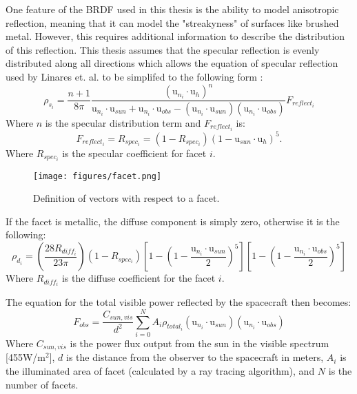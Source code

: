 One feature of the BRDF used in this thesis is the ability to model anisotropic reflection, meaning that it can model the "streakyness" of surfaces like brushed metal. However, this requires additional information to describe the distribution of this reflection. This thesis assumes that the specular reflection is evenly distributed along all directions which allows the equation of specular reflection used by Linares et. al. to be simplifed to the following form \cite{Linares_data_fusion}:
\begin{equation}\label{Phong_Specular}
\rho_{s_i} = \frac{n + 1}{8\pi}
\frac{(\bm{\mathrm{u}}_{n_i}\cdotp \bm{\mathrm{u}}_h)^n}
{\bm{\mathrm{u}}_{n_i}\cdotp \bm{\mathrm{u}}_{sun} + \bm{\mathrm{u}}_{n_i}\cdotp \bm{\mathrm{u}}_{obs} - (\bm{\mathrm{u}}_{n_i}\cdotp \bm{\mathrm{u}}_{sun})(\bm{\mathrm{u}}_{n_i}\cdotp \bm{\mathrm{u}}_{obs})}F_{reflect_i}
\end{equation}
Where $n$ is the specular distribution term and $F_{reflect_i}$ is:
\begin{equation}
F_{reflect_i} = R_{spec_i} = (1 - R_{spec_i})(1 - \bm{\mathrm{u}}_{sun}\cdotp \bm{\mathrm{u}}_h)^5.
\end{equation}
Where $R_{spec_i}$ is the specular coefficient for facet $i$.

\begin{figure}[h!]
	\centering
	\texttt{[image: figures/facet.png]}
	\caption{Definition of vectors with respect to a facet.}
	\label{facet}
\end{figure}

If the facet is metallic, the diffuse component is simply zero, otherwise it is the following:
\begin{equation}\label{Phong_Diffuse}
\rho_{d_i} = \left(\frac{28R_{diff_i}}{23\pi}\right)
(1 - R_{spec_i})
\left[1 - (1 - \frac{\bm{\mathrm{u}}_{n_i}\cdotp \bm{\mathrm{u}}_{sun}}{2})^5\right]
\left[1 - (1 - \frac{\bm{\mathrm{u}}_{n_i}\cdotp \bm{\mathrm{u}}_{obs}}{2})^5\right]
\end{equation}
Where $R_{diff_i}$ is the diffuse coefficient for the facet $i$.

The equation for the total visible power reflected by the spacecraft then becomes:
\begin{equation}
F_{obs} = \frac{C_{sun,vis}}{{d^2}}\sum_{i=0}^N A_i\rho_{total_i}(\bm{\mathrm{u}}_{n_i}\cdotp \bm{\mathrm{u}}_{sun})(\bm{\mathrm{u}}_{n_i}\cdotp \bm{\mathrm{u}}_{obs})
\end{equation}
Where $C_{sun,vis}$ is the power flux output from the sun in the visible spectrum [455W/m$^2$], $d$ is the distance from the observer to the spacecraft in meters, $A_i$ is the illuminated area of facet (calculated by a ray tracing algorithm), and $N$ is the number of facets.


